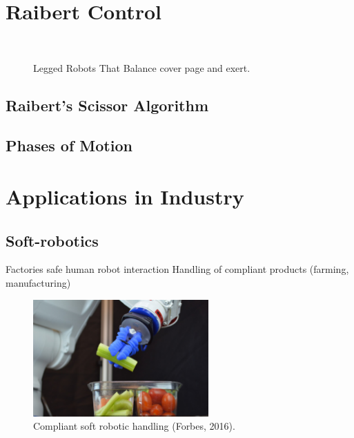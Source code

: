 \section{Raibert Control}

\begin{figure}
\centering
{}
~
\caption{Legged Robots That Balance cover page and exert.\cite{Raibert1989}}
\end{figure}

\subsection{Raibert's Scissor Algorithm}

\subsection{Phases of Motion}

\section{Applications in Industry}
\subsection{Soft-robotics}
Factories safe human robot interaction
Handling of compliant products (farming, manufacturing)


\begin{figure}
\centering
\includegraphics[width=0.6\textwidth]{images/literature/SoftRobotCelery} 
\caption{Compliant soft robotic handling (Forbes, 2016).}
\label{fig:Compliant soft robotic handling}
\end{figure}
\cite{Knapp}

